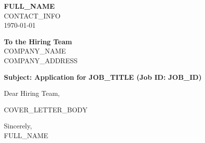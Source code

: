 \documentclass[11pt,a4paper]{article}
\begin{document}
\begin{flushright}
    \textbf{{{FULL_NAME}}} \\
    {{CONTACT_INFO}} \\
    \vspace{1em}
    \today
\end{flushright}

\vspace{2em}

\begin{flushleft}
    \textbf{To the Hiring Team} \\
    {{COMPANY_NAME}} \\
    {{COMPANY_ADDRESS}} \\
\end{flushleft}

\vspace{1.5em}

\noindent \textbf{Subject: Application for {{JOB_TITLE}} (Job ID: {{JOB_ID}})}

\vspace{1.5em}

\noindent Dear Hiring Team,

\vspace{1em}

{{COVER_LETTER_BODY}}

\vspace{2em}

\begin{flushleft}
    Sincerely, \\
    \vspace{2em}
    {{FULL_NAME}}
\end{flushleft}
\end{document}
